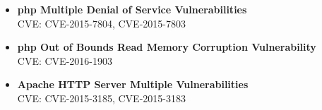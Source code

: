 \begin{itemize}
\item \textbf{php Multiple Denial of Service Vulnerabilities} \\
CVE: CVE-2015-7804, CVE-2015-7803\\


\item \textbf{php Out of Bounds Read Memory Corruption Vulnerability} \\
CVE: CVE-2016-1903\\

\item \textbf{Apache HTTP Server Multiple Vulnerabilities} \\
CVE: CVE-2015-3185, CVE-2015-3183\\


\end{itemize}